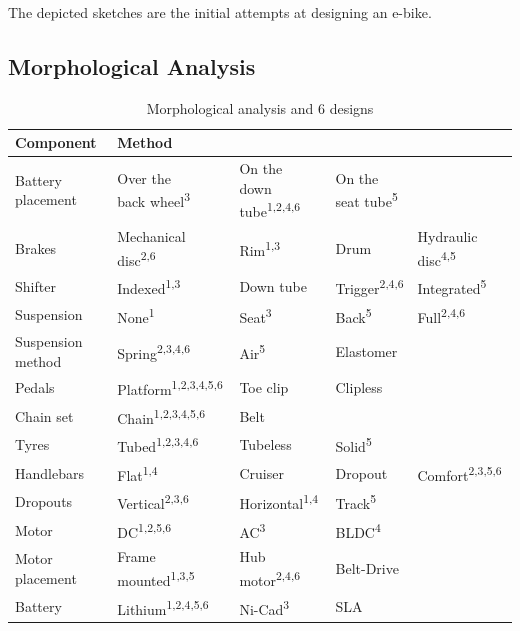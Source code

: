 \documentclass[a4paper,11pt]{article}
\begin{document}
The depicted sketches are the initial attempts at designing an e-bike.

\newpage

\subsection{Morphological Analysis}

\begin{table}[!ht]
	\centering
	\caption{Morphological analysis and 6 designs}
	\begin{tabular}{l l l l l}
		\hline
		Component&Method&&&\\\hline
		Battery placement&\makecell[l]{Over the\\back wheel\textsuperscript{3}}&\makecell[l]{On the \\down tube\textsuperscript{1,2,4,6}}&\makecell[l]{On the \\seat tube\textsuperscript{5}}&\\\hline
		Brakes&Mechanical disc\textsuperscript{2,6}&Rim\textsuperscript{1,3}&Drum&Hydraulic disc\textsuperscript{4,5}\\\hline
		Shifter&Indexed\textsuperscript{1,3}&Down tube&Trigger\textsuperscript{2,4,6}&Integrated\textsuperscript{5}\\\hline
		Suspension&None\textsuperscript{1}&Seat\textsuperscript{3}&Back\textsuperscript{5}&Full\textsuperscript{2,4,6}\\\hline
		Suspension method&Spring\textsuperscript{2,3,4,6}&Air\textsuperscript{5}&Elastomer\\\hline
		Pedals&Platform\textsuperscript{1,2,3,4,5,6}&Toe clip&Clipless\\\hline
		Chain set&Chain\textsuperscript{1,2,3,4,5,6}&Belt&&\\\hline
		Tyres&Tubed\textsuperscript{1,2,3,4,6}&Tubeless&Solid\textsuperscript{5}&\\\hline
		Handlebars&Flat\textsuperscript{1,4}&Cruiser&Dropout&Comfort\textsuperscript{2,3,5,6}\\\hline
		Dropouts&Vertical\textsuperscript{2,3,6}&Horizontal\textsuperscript{1,4}&Track\textsuperscript{5}&\\\hline
		Motor&DC\textsuperscript{1,2,5,6}&AC\textsuperscript{3}&BLDC\textsuperscript{4}&\\\hline
		Motor placement&Frame mounted\textsuperscript{1,3,5}&Hub motor\textsuperscript{2,4,6}&Belt-Drive&\\\hline
		Battery&Lithium\textsuperscript{1,2,4,5,6}&Ni-Cad\textsuperscript{3}&SLA&\\\hline

\end{tabular}
\end{table}
\end{document}
